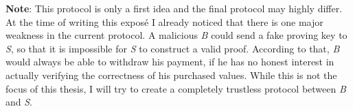 \noindent \textbf{Note}: This protocol is only a first idea and the final protocol may highly differ. At the time of writing this exposé I already noticed that there is one major weakness in the current protocol. A malicious \emph{B} could send a fake proving key to \emph{S}, so that it is impossible for \emph{S} to construct a valid proof. According to that, \emph{B} would always be able to withdraw his payment, if he has no honest interest in actually verifying the correctness of his purchased values. While this is not the focus of this thesis, I will try to create a completely trustless protocol between \emph{B} and \emph{S}.